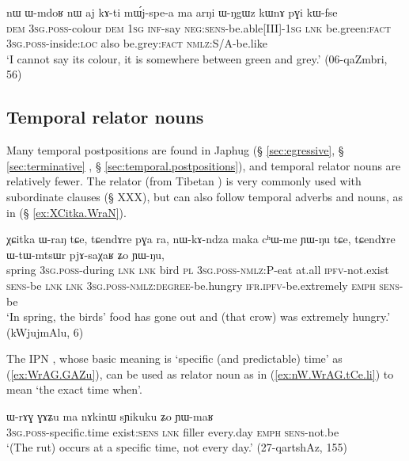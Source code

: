   \begin{exe}
\ex \label{ex:arNi.WNgWz} 
\gll nɯ ɯ-mdoʁ nɯ aj kɤ-ti mɯ́j-spe-a ma arŋi ɯ-ŋgɯz kɯnɤ pɣi kɯ-fse   \\
\textsc{dem} \textsc{3sg}.\textsc{poss}-colour \textsc{dem} \textsc{1sg} \textsc{inf}-say \textsc{neg}:\textsc{sens}-be.able[III]-\textsc{1sg} \textsc{lnk} be.green:\textsc{fact} \textsc{3sg}.\textsc{poss}-inside:\textsc{loc} also be.grey:\textsc{fact} \textsc{nmlz}:S/A-be.like \\
\glt `I cannot say its colour, it is somewhere between green and grey.' (06-qaZmbri, 56)
    \end{exe}
    
 
 \subsection{Temporal relator nouns} \label{sec:relator.temporal}
Many temporal postpositions are found in Japhug (§ \ref{sec:egressive}, § \ref{sec:terminative} , § \ref{sec:temporal.postpositions}), and temporal relator nouns are relatively fewer. The relator   (from Tibetan ) is very commonly used with subordinate clauses (§ XXX), but can also follow temporal adverbs and nouns, as in (§ \ref{ex:XCitka.WraN}).
 
   \begin{exe}
\ex \label{ex:XCitka.WraN} 
\gll χɕitka ɯ-raŋ tɕe, tɕendɤre pɣa ra, nɯ-kɤ-ndza maka cʰɯ-me ɲɯ-ŋu tɕe, tɕendɤre ɯ-tɯ-mtsɯr pjɤ-saχaʁ ʑo ɲɯ-ŋu,  \\
spring \textsc{3sg}.\textsc{poss}-during \textsc{lnk} \textsc{lnk} bird \textsc{pl} \textsc{3sg}.\textsc{poss}-\textsc{nmlz}:P-eat at.all \textsc{ipfv}-not.exist \textsc{sens}-be \textsc{lnk} \textsc{lnk} \textsc{3sg}.\textsc{poss}-\textsc{nmlz}:\textsc{degree}-be.hungry \textsc{ifr}.\textsc{ipfv}-be.extremely \textsc{emph} \textsc{sens}-be \\
\glt `In spring, the birds' food has gone out and (that crow) was extremely hungry.' (kWjujmAlu, 6)
\end{exe}

The IPN , whose basic meaning is `specific (and predictable) time' as (\ref{ex:WrAG.GAZu}), can be used as relator noun as in (\ref{ex:nW.WrAG.tCe.li}) to mean `the exact time when'.

\begin{exe}
\ex \label{ex:WrAG.GAZu}
\gll ɯ-rɤɣ ɣɤʑu ma nɤkinɯ sɲikuku ʑo ɲɯ-maʁ \\
\textsc{3sg}.\textsc{poss}-specific.time exist:\textsc{sens} \textsc{lnk} filler every.day \textsc{emph} \textsc{sens}-not.be \\
\glt `(The rut) occurs at a specific time, not every day.' (27-qartshAz, 155)
\end{exe}

